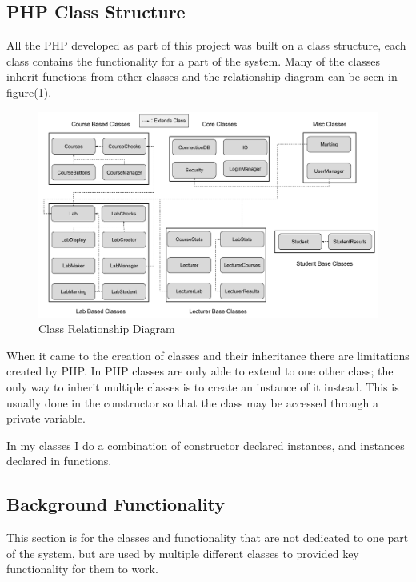 \documentclass[12pt]{article}  %
\begin{document}
\newpage
\subsection{PHP Class Structure}

All the PHP developed as part of this project was built on a class structure, each class contains the functionality for a part of the system. Many of the classes inherit functions from other classes and the relationship diagram can be seen in figure(\ref{fig:implement-relationship}).

\begin{figure}[H]
    \centering
    \includegraphics[width=1\textwidth]{images/implementation/Class-Structure.png}
    \caption{Class Relationship Diagram}
    \label{fig:implement-relationship}
\end{figure}

When it came to the creation of classes and their inheritance there are limitations created by PHP. In PHP classes are only able to extend to one other class; the only way to inherit multiple classes is to create an instance of it instead. This is usually done in the constructor  so that the class may be accessed through a private variable. 


In my classes I do a combination of constructor declared instances, and instances declared in functions.






\subsection{Background Functionality}

This section is for the classes and functionality that are not dedicated to one part of the system, but are used by multiple different classes to provided key functionality for them to work.  
\end{document}
